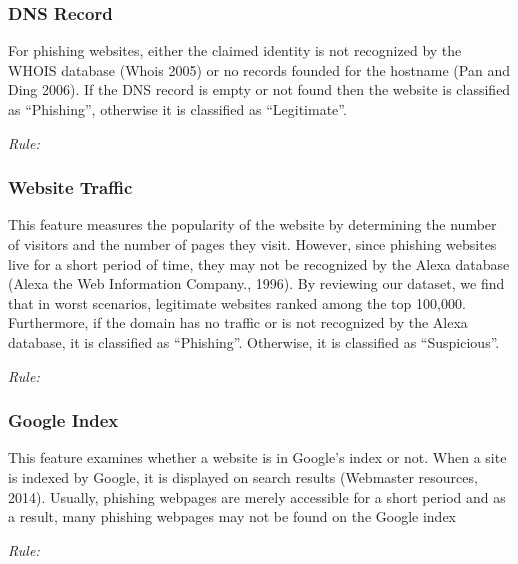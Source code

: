 \documentclass[twocolumn,10pt]{article}
\begin{document}
\subsubsection{DNS Record}
For phishing websites, either the claimed identity is not recognized by the WHOIS database (Whois 2005) or no records founded for the hostname (Pan and Ding 2006). If the DNS record is empty or not found then the website is classified as “Phishing”, otherwise it is classified as “Legitimate”. 
\begin{center}
\it Rule:
\end{center}
\subsubsection{Website Traffic}

This feature measures the popularity of the website by determining the number of visitors and the number of pages they visit. However, since phishing websites live for a short period of time, they may not be recognized by the Alexa database (Alexa the Web Information Company., 1996). By reviewing our dataset, we find that in worst scenarios, legitimate websites ranked among the top 100,000. Furthermore, if the domain has no traffic or is not recognized by the Alexa database, it is classified as “Phishing”. Otherwise, it is classified as “Suspicious”. 
\begin{center}
	\it Rule:
\end{center}
\subsubsection{Google Index}

This feature examines whether a website is in Google’s index or not. When a site is indexed by
Google, it is displayed on search results (Webmaster resources, 2014). Usually, phishing webpages
are merely accessible for a short period and as a result, many phishing webpages may not be found on
the Google index
\begin{center}
\it Rule:
\end{center}
\end{document}
